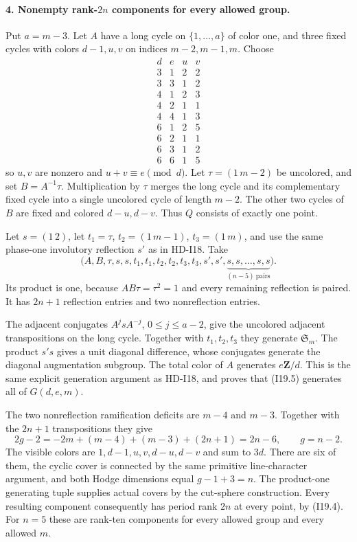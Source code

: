 \paragraph{4. Nonempty rank-$2n$ components for every allowed group.}
Put $a=m-3$. Let $A$ have a long cycle on
$\{1,\ldots,a\}$ of color one, and three fixed cycles with
colors $d-1,u,v$ on indices $m-2,m-1,m$. Choose
\[
\begin{array}{c|c|c|c}
 d&e&u&v\\\hline
 3&1&2&2\\
 3&3&1&2\\
 4&1&2&3\\
 4&2&1&1\\
 4&4&1&3\\
 6&1&2&5\\
 6&2&1&1\\
 6&3&1&2\\
 6&6&1&5
\end{array}
\]
so $u,v$ are nonzero and $u+v\equiv e\pmod d$.
Let $\tau=(1\,m-2)$ be uncolored, and set
$B=A^{-1}\tau$. Multiplication by $\tau$ merges the long
cycle and its complementary fixed cycle into a single
uncolored cycle of length $m-2$. The other two cycles of
$B$ are fixed and colored $d-u,d-v$. Thus $Q$ consists
of exactly one point.

Let $s=(1\,2)$, let $t_1=\tau$, $t_2=(1\,m-1)$,
$t_3=(1\,m)$, and use the same phase-one involutory
reflection $s'$ as in HD-I18. Take
\begin{equation}
 \bigl(A,B,\tau,
     s,s,t_1,t_1,t_2,t_2,t_3,t_3,s',s',
         \underbrace{s,s,\ldots,s,s}_{(n-5)\ \text{pairs}}\bigr).
                                                        \tag{I19.5}
\end{equation}
Its product is one, because $AB\tau=\tau^2=1$ and every
remaining reflection is paired. It has $2n+1$ reflection
entries and two nonreflection entries.

The adjacent conjugates $A^jsA^{-j}$, $0\leq j\leq a-2$,
give the uncolored adjacent transpositions on the long cycle.
Together with $t_1,t_2,t_3$ they generate $\mathfrak S_m$.
The product $s's$ gives a unit diagonal difference, whose
conjugates generate the diagonal augmentation subgroup.
The total color of $A$ generates $e\mathbf Z/d$. This is
the same explicit generation argument as HD-I18, and proves
that (I19.5) generates all of $G(d,e,m)$.

The two nonreflection ramification deficits are $m-4$ and
$m-3$. Together with the $2n+1$ transpositions they give
\[
 2g-2=-2m+(m-4)+(m-3)+(2n+1)=2n-6,
 \qquad g=n-2.
\]
The visible colors are $1,d-1,u,v,d-u,d-v$ and sum to
$3d$. There are six of them, the cyclic cover is connected
by the same primitive line-character argument, and both
Hodge dimensions equal $g-1+3=n$. The product-one generating
tuple supplies actual covers by the cut-sphere construction.
Every resulting component consequently has period rank $2n$
at every point, by (I19.4). For $n=5$ these are rank-ten
components for every allowed group and every allowed $m$.

